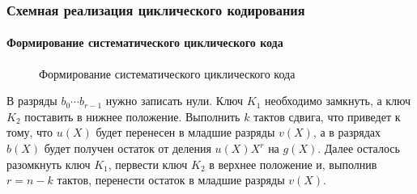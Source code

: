 \begin{frame}
    \frametitle{Схемная реализация циклического кодирования}
    \framesubtitle{Формирование систематического циклического кода}
    
    \begin{figure}
        \begin{center}
            \caption{Формирование систематического циклического кода}\label{pict:lfsrEncode}
        \end{center}
    \end{figure} 
\end{frame}

В разряды $b_0\cdots b_{r-1}$ нужно записать нули. Ключ $K_1$ необходимо замкнуть, а ключ $K_2$ поставить в нижнее положение. Выполнить $k$ тактов сдвига, что приведет к тому, что $u(X)$ будет перенесен в младшие разряды $v(X)$, а в разрядах $b(X)$ будет получен остаток от деления $u(X)X^r$ на $g(X)$. Далее осталось разомкнуть ключ $K_1$, первести ключ $K_2$ в верхнее положение и, выполнив $r=n-k$ тактов, перенести остаток в младшие разряды $v(X)$.

